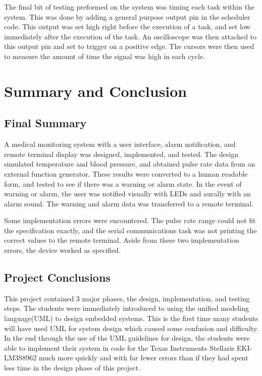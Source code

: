 \documentclass[12pt]{article} %
\begin{document}
    The final bit of testing preformed on the system was timing each task within
    the system. This was done by adding a general purpose output pin in the
    scheduler code. This output was set high right before the execution of a task,
    and set low immediately after the execution of the task. An oscilloscope was
    then attached to this output pin and set to trigger on a positive edge. The
    cursors were then used to measure the amount of time the signal was high in
    each cycle.


    \section{Summary and Conclusion}

    \subsection{Final Summary} 

    A medical monitoring system with a user interface, alarm notification, and
    remote terminal display was designed, implemented, and tested.  The design
    simulated temperature and blood pressure, and obtained pulse rate data from
    an external function generator.  These results were converted to a human
    readable form, and tested to see if there was a warning or alarm state.
    In the event of warning or alarm, the user was notified visually with LEDs
    and aurally with an alarm sound.  The warning and alarm data was transferred
    to a remote terminal.  

    Some implementation errors were encountered.  The pulse rate range could
    not fit the specification exactly, and the serial communications task was
    not printing the correct values to the remote terminal. Aside from these
    two implementation errors, the device worked as specified.

    \subsection{Project Conclusions} 
    
    This project contained 3 major phases, the design, implementation, and
    testing steps. The students were immediately introduced to using the
    unified modeling language(UML) to design embedded systems. This is the
    first time many students will have used UML for system design which caused
    some confusion and difficulty. In the end through the use of the UML
    guidelines for design, the students were able to implement their system in
    code for the Texas Instruments Stellaris EKI-LM3S8962 much more quickly and
    with far fewer errors than if they had spent less time in the design phase
    of this project. 
\end{document}
